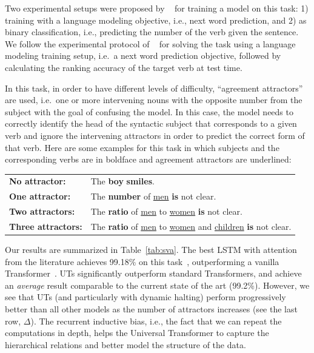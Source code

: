 Two experimental setups were proposed by ~\citet{linzen2016assessing} for training a model on this task: 1) training with a language modeling objective, i.e., next word prediction, and 2) as binary classification, i.e., predicting the number of the verb given the sentence. 
We follow the experimental protocol of ~\citet{linzen2016assessing} for solving the task using a language modeling training setup, i.e.\ a next word prediction objective, followed by calculating the ranking accuracy of the target verb at test time. 

In this task, in order to have different levels of difficulty, ``agreement attractors'' are used, i.e.\ one or more intervening nouns with the opposite number from the subject with the goal of confusing the model. In this case, the model needs to correctly identify the head of the syntactic subject that corresponds to a given verb and ignore the intervening attractors in order to predict the correct form of that verb.
Here are some examples for this task in which subjects and the corresponding verbs are in boldface and agreement attractors are underlined:
\begin{table}[h!]
\fontsize{9}{10}\selectfont
\begin{tabular}{l l}
\textbf{No attractor:} & The \textbf{boy} \textbf{smiles}. \\
\textbf{One attractor:}  &  The \textbf{number} of \underline{men} \textbf{is} not clear. \\
\textbf{Two attractors:}  &  The \textbf{ratio} of \underline{men} to \underline{women} \textbf{is} not clear. \\
\textbf{Three attractors:} &  The \textbf{ratio} of \underline{men} to \underline{women} and \underline{children} \textbf{is} not clear. 
\end{tabular}
\end{table}


Our results are summarized in Table~\ref{tab:sva}. The best LSTM with attention from the literature achieves 99.18\% on this task~\citep{yogatama2018memory}, outperforming a vanilla Transformer~\citep{tran18}. UTs significantly outperform standard Transformers, and achieve an \emph{average} result comparable to the current state of the art (99.2\%). However, we see that UTs (and particularly with dynamic halting) perform progressively better than all other models as the number of attractors increases (see the last row, $\Delta$).
The recurrent inductive bias, i.e., the fact that we can repeat the computations in depth, helps the Universal Transformer to capture the hierarchical relations and better model the structure of the data.

